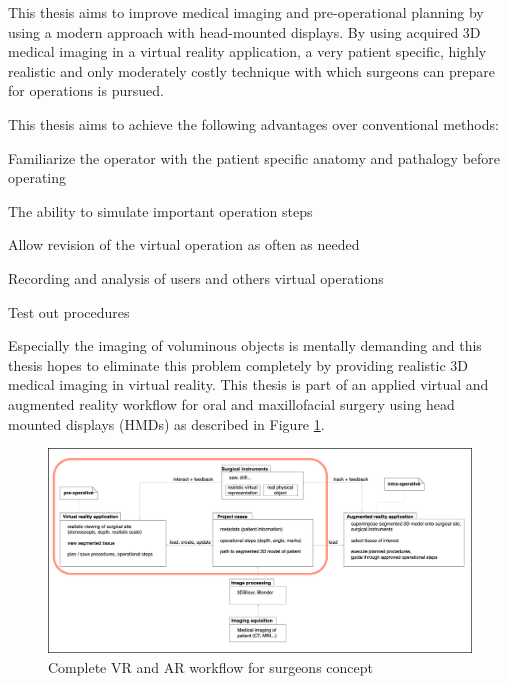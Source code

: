 This thesis aims to improve medical imaging and pre-operational planning by using a modern approach with head-mounted displays.
By using acquired 3D medical imaging in a virtual reality application, a very patient specific, highly realistic and only moderately costly technique with which surgeons can prepare for operations is pursued.

This thesis aims to achieve the following advantages over conventional methods:
\begin{compactenum}[label=(\alph*)]
    \item Familiarize the operator with the patient specific anatomy and pathalogy before operating
    \item The ability to simulate important operation steps
    \item Allow revision of the virtual operation as often as needed
    \item Recording and analysis of users and others virtual operations
    \item Test out procedures
\end{compactenum}

Especially the imaging of voluminous objects is mentally demanding and this thesis hopes to eliminate this problem completely by providing realistic 3D medical imaging in virtual reality.
This thesis is part of an applied virtual and augmented reality workflow for oral and maxillofacial surgery using head mounted displays (HMDs) as described in Figure \ref{fig::ProjectPlan}.

\begin{figure}[ht!]
    \centering
    \includegraphics[width=\linewidth]{images/project_plan.png}
    \caption{\label{fig::ProjectPlan} Complete VR and AR workflow for surgeons concept}
\end{figure}


